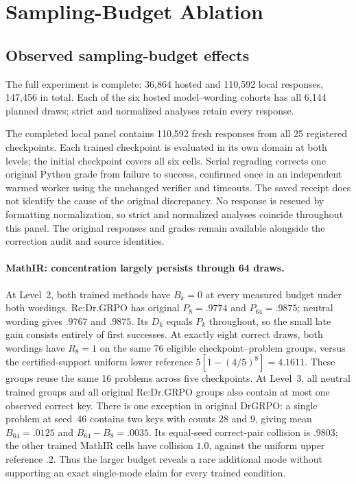 \documentclass{article}
\newcommand{\1}{\mathbf 1}
\theoremstyle{remark}
\theoremstyle{definition}
\theoremstyle{plain}
\begin{document}
\clearpage
\section{Sampling-Budget Ablation}
\label{app:sampling-budget-ablation}







\subsection{Observed sampling-budget effects}
\label{app:sampling-budget-effects}

The full experiment is complete: 36,864 hosted and 110,592 local responses,
147,456 in total. Each of the six hosted model--wording cohorts has all
6,144 planned draws; strict and normalized analyses retain every response.

The completed local panel contains 110,592 fresh responses from all 25
registered checkpoints. Each trained checkpoint is evaluated in its own domain
at both levels; the initial checkpoint covers all six cells. Serial regrading
corrects one original Python grade from failure to success, confirmed once
in an independent warmed worker using the unchanged verifier and timeouts.
The saved receipt does not identify the cause of the original discrepancy.
No response is rescued by formatting normalization, so strict and normalized
analyses coincide throughout this panel. The original responses and grades
remain available alongside the correction audit and source identities.

\paragraph{MathIR: concentration largely persists through 64 draws.}
At Level~2, both trained methods have $B_k=0$ at every measured budget under
both wordings. Re:Dr.GRPO has original $P_8=.9774$ and $P_{64}=.9875$;
neutral wording gives $.9767$ and $.9875$. Its $D_k$ equals $P_k$ throughout,
so the small late gain consists entirely of first successes. At exactly eight
correct draws, both wordings have $R_8=1$ on the same 76 eligible
checkpoint--problem groups, versus the certified-support uniform lower
reference $5[1-(4/5)^8]=4.1611$. These groups reuse the same 16 problems
across five checkpoints. At Level~3, all neutral trained groups and all
original Re:Dr.GRPO groups also contain at most one observed correct key.
There is one exception in original DrGRPO: a single problem at seed~46
contains two keys with counts 28 and 9, giving mean $B_{64}=.0125$ and
$B_{64}-B_8=.0035$. Its equal-seed correct-pair collision is $.9803$;
the other trained MathIR cells have collision $1.0$, against the uniform
upper reference $.2$. Thus the larger budget reveals a rare additional mode
without supporting an exact single-mode claim for every trained condition.
\end{document}
